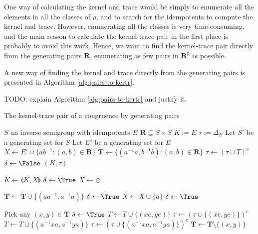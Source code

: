 One way of calculating the kernel and trace would be simply to enumerate all the
elements in all the classes of $\rho$, and to search for the idempotents to
compute the kernel and trace.  However, enumerating all the classes is very
time-consuming, and the main reason to calculate the kernel-trace pair in the
first place is probably to avoid this work.  Hence, we want to find the
kernel-trace pair directly from the generating pairs $\mathbf{R}$, enumerating
as few pairs in $\mathbf{R}^\sharp$ as possible.

A new way of finding the kernel and trace directly from the generating pairs is
presented in Algorithm \ref{alg:pairs-to-kertr}.

TODO: explain Algorithm \ref{alg:pairs-to-kertr} and justify it.

\begin{algorithm}
\caption{The kernel-trace pair of a congruence by generating pairs}
\label{alg:pairs-to-kertr}
\begin{algorithmic}[1]
\Require $S$ an inverse semigroup with idempotents $E$
\Require $\mathbf{R} \subseteq S \times S$
\State $K := E$
\State $\tau := \Delta_E$
\State Let $S'$ be a generating set for $S$
\State Let $E'$ be a generating set for $E$
\State $X \gets E' \cup \{ab^{-1} : (a,b) \in \mathbf{R}\}$
\State $\mathbf{T} \gets \{(a^{-1}a, b^{-1}b) : (a,b) \in \mathbf{R}\}$
\State $\tau \gets (\tau \cup T)^e$
\Repeat
\State $\delta \gets \False$ 
\State {}
\State {}
\State {}
\Until{$\delta = \False$} 
\State \Return $(K, \tau)$
\EndProcedure

  \State $K \gets \llangle K, X \rrangle$
  \State $\delta \gets \True$
\EndIf
\State $X \gets \varnothing$
\EndProcedure

      \State $\mathbf{T} \gets \mathbf{T} \cup \{(aa^{-1}, a^{-1}a)\}$
      \State $\delta \gets \True$
    \EndIf
  \Else
        \State $X \gets X \cup \{a\}$
        \State $\delta \gets \True$
      \EndIf
    \EndFor
  \EndIf
\EndFor
\EndProcedure

  \State Pick any $(x,y) \in \mathbf{T}$
      \State $\delta \gets \True$
      \State $T \gets T \cup \{(xe, ye)\}$
      \State $\tau \gets (\tau \cup \{(xe, ye)\})^e$
          \State $T \gets T \cup \{(a^{-1}xa, a^{-1}ya)\}$
          \State $\tau \gets (\tau \cup \{(a^{-1}xa, a^{-1}ya)\})^e$
        \EndIf
      \EndFor
    \EndIf
  \EndFor
  \State $\mathbf{T} \gets \mathbf{T} \setminus \{(x,y)\}$
\EndWhile
\EndProcedure
\end{algorithmic}
\end{algorithm}

